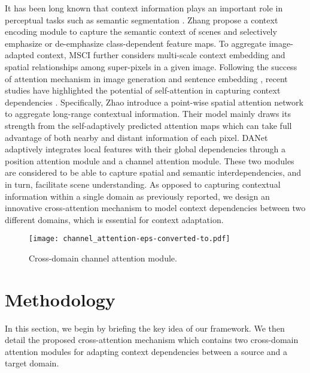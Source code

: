 \documentclass[10pt,twocolumn,letterpaper]{article}
\begin{document}
	It has been long known that context information plays an important role in perceptual tasks such as semantic segmentation \cite{mottaghi2014role}. Zhang \etal \cite{zhang2018context} propose a context encoding module to capture the semantic context of scenes and selectively emphasize or de-emphasize class-dependent feature maps. To aggregate image-adapted context, MSCI \cite{lin2018multi} further considers multi-scale context embedding and spatial relationships among super-pixels in a given image. Following the success of attention mechanism \cite{vaswani2017attention} in image generation \cite{zhang2018self} and sentence embedding \cite{lin2017structured}, recent studies have highlighted the potential of self-attention in capturing context dependencies \cite{fu2019dual, zhao2018psanet}. Specifically, Zhao \etal \cite{zhao2018psanet} introduce a point-wise spatial attention network to aggregate long-range contextual information. Their model mainly draws its strength from the self-adaptively predicted attention maps which can take full advantage of both nearby and distant information of each pixel. DANet \cite{fu2019dual} adaptively integrates local features with their global dependencies through a position attention module and a channel attention module. These two modules are considered to be able to capture spatial and semantic interdependencies, and in turn, facilitate scene understanding. As opposed to capturing contextual information within a single domain as previously reported, we design an innovative cross-attention mechanism to model context dependencies between two different domains, which is essential for context adaptation.


	\begin{figure}[t]
		\begin{center}
			\texttt{[image: channel\_attention-eps-converted-to.pdf]}
		\end{center}
		\caption{Cross-domain channel attention module.}
		\label{fig:channel_attention}
		\vspace{-0.2in}
	\end{figure}


	\section{Methodology}

	In this section, we begin by briefing the key idea of our framework. We then detail the proposed cross-attention mechanism which contains two cross-domain attention modules for adapting context dependencies between a source and a target domain.
\end{document}
